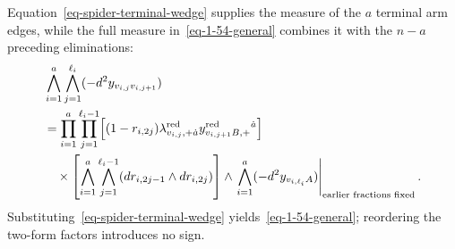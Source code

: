 \documentclass[11pt]{article}
\numberwithin{equation}{section}
\numberwithin{figure}{section}
\numberwithin{table}{section}
\begin{document}
\begin{proofbox}
Equation~\eqref{eq-spider-terminal-wedge} supplies the measure of the $a$ terminal arm edges, while the full measure in~\eqref{eq-1-54-general} combines it with the $n-a$ preceding eliminations:
\begin{equation}\label{eq-spider-full-measure}
\begin{aligned}
&\bigwedge_{i=1}^a\bigwedge_{j=1}^{\ell_i}
(-d^2y_{v_{i,j}v_{i,j+1}})\\
&=\prod_{i=1}^a\prod_{j=1}^{\ell_i-1}
\Bigl[(1-r_{i,2j})\lambda_{v_{i,j},+\dot a}^{\mathrm{red}}
y_{v_{i,j+1}B,+}^{\mathrm{red}}{}^{\dot a}\Bigr]\\
&\quad\times\left[\bigwedge_{i=1}^a\bigwedge_{j=1}^{\ell_i-1}
(dr_{i,2j-1}\wedge dr_{i,2j})\right]
\wedge\left.\bigwedge_{i=1}^a(-d^2y_{v_{i,\ell_i}A})\right|_{\substack{\text{earlier fractions fixed}}}.
\end{aligned}
\end{equation}
Substituting~\eqref{eq-spider-terminal-wedge} yields~\eqref{eq-1-54-general}; reordering the two-form factors introduces no sign.~\hfill\qedsymbol
\end{proofbox}
\end{document}
